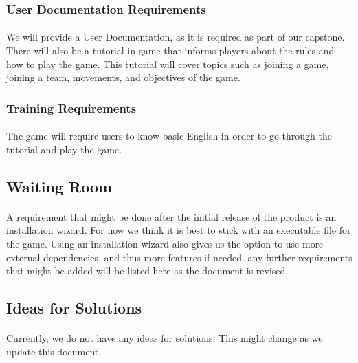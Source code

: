 \documentclass[12pt, titlepage]{article}
\begin{document}
\subsubsection{User Documentation Requirements}
\paragraph{}We will provide a User Documentation, as it is required as part of our capstone. There will also be a tutorial in game that informs players about the rules and how to play the game. This tutorial will cover topics such as joining a game, joining a team, movements, and objectives of the game. 
\subsubsection{Training Requirements}
\paragraph{}The game will require users to know basic English in order to go through the tutorial and play the game.
\subsection{Waiting Room}
\paragraph{}A requirement that might be done after the initial release of the product is an installation wizard. For now we think it is best to stick with an executable file for the game. Using an installation wizard also gives us the option to use more external dependencies, and thus more features if needed. any further requirements that might be added will be listed here as the document is revised.
\subsection{Ideas for Solutions}
\paragraph{}Currently, we do not have any ideas for solutions. This might change as we update this document.


\end{document}
